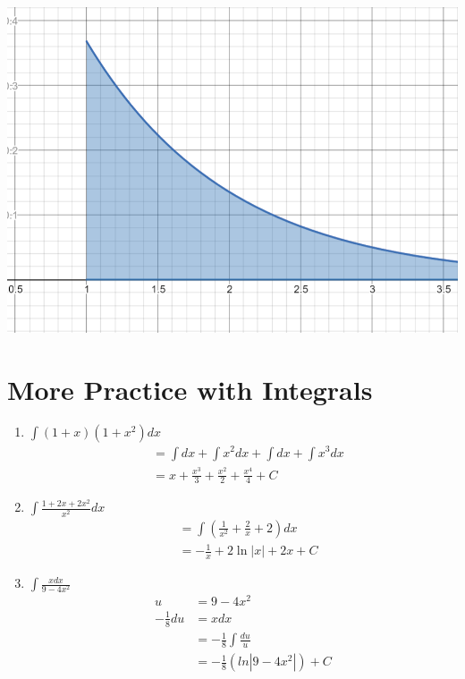\documentclass[12pt]{article}
\begin{document}
    \includegraphics[width=\textwidth]{41}
 
 
\newpage
\section{More Practice with Integrals}

\begin{enumerate}
    \item $\int (1+x)(1+x^2)dx$
        \begin{align*}
             &=\int dx + \int x^2dx + \int dx + \int x^3dx \\
             &= x +\frac{x^3}{3} + \frac{x^2}{2} + \frac{x^4}{4} + C 
        \end{align*}
        
    \item $\int \frac{1+2x+2x^2}{x^2}dx$
        \begin{align*}
            &= \int \left(\frac{1}{x^2}+\frac{2}{x}+2\right)dx\\
            &= -\frac{1}{x}+2\ln|x|+2x+C
        \end{align*}

    \item $\int \frac{xdx}{9-4x^2}$
        \begin{align*}
            u &= 9-4x^2\\
            -\frac{1}{8}du &= xdx\\
            &= -\frac{1}{8}\int\frac{du}{u}\\
            &= -\frac{1}{8}\left(ln|9-4x^2|\right)+C\\
        \end{align*}
    
\end{enumerate}
\end{document}
